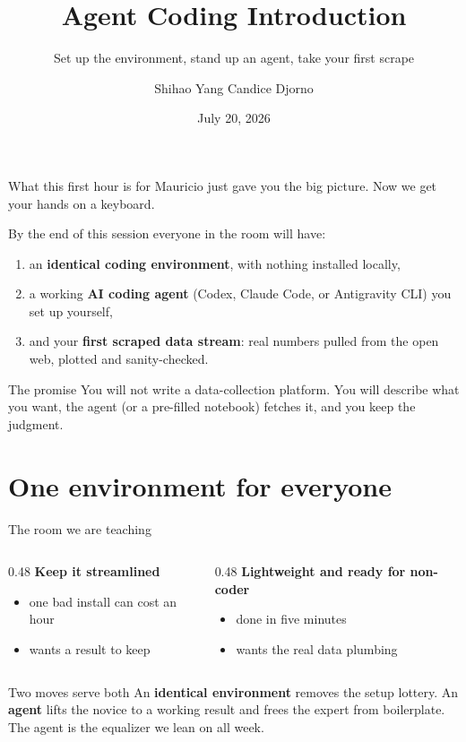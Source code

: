 \documentclass[aspectratio=169,11pt]{beamer}
\title{Agent Coding Introduction}
\subtitle{Set up the environment, stand up an agent, take your first scrape}
\author{Shihao Yang \quad\textbullet\quad Candice Djorno}
\institute{SISMID 2026 \textbullet\ Day 1, 9:45}
\date{July 20, 2026}
\begin{document}
\begin{frame}
  \titlepage
\end{frame}

\begin{frame}{What this first hour is for}
  Mauricio just gave you the big picture. Now we get your hands on a keyboard.

  \medskip
  By the end of this session everyone in the room will have:
  \begin{enumerate}
    \item an \textbf{identical coding environment}, with nothing installed locally,
    \item a working \textbf{AI coding agent} (Codex, Claude Code, or Antigravity CLI) you set up yourself,
    \item and your \textbf{first scraped data stream}: real numbers pulled from the
          open web, plotted and sanity-checked.
  \end{enumerate}
  \vfill
  \begin{alertblock}{The promise}
    You will not write a data-collection platform. You will describe what you want,
    the agent (or a pre-filled notebook) fetches it, and you keep the judgment.
  \end{alertblock}
\end{frame}

\section{One environment for everyone}

\begin{frame}{The room we are teaching}
  \begin{columns}[T]
    \begin{column}{0.48\textwidth}
      \textbf{Keep it streamlined}
      \begin{itemize}
        \item one bad install can cost an hour
        \item wants a result to keep
      \end{itemize}
    \end{column}
    \begin{column}{0.48\textwidth}
      \textbf{Lightweight and ready for non-coder}
      \begin{itemize}
        \item done in five minutes
        \item wants the real data plumbing
      \end{itemize}
    \end{column}
  \end{columns}
  \vfill
  \begin{block}{Two moves serve both}
    An \textbf{identical environment} removes the setup lottery. An \textbf{agent}
    lifts the novice to a working result and frees the expert from boilerplate. The
    agent is the equalizer we lean on all week.
  \end{block}
\end{frame}
\end{document}
